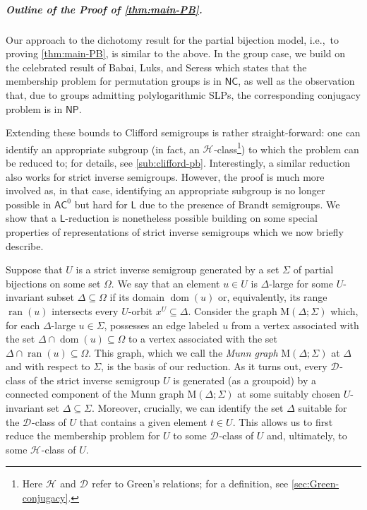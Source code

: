 \documentclass[anonymous,letter,UKenglish,cleveref,autoref,thm-restate]{lipics-v2021}
\newcommand{\ie}{i.e.,~}
\newcommand{\sse}{\subseteq}
\newcommand{\dom}{\operatorname{dom}}
\newcommand{\ran}{\operatorname{ran}}
\newcommand{\ACz}{\ensuremath{\mathsf{AC}^0}\xspace}
\newcommand{\NC}{\ensuremath{\mathsf{NC}}\xspace}
\newcommand{\LOGSPACE}{\ensuremath{\mathsf{L}}\xspace}
\newcommand{\NP}{\ensuremath{\mathsf{NP}}\xspace}
\newcommand*{\gH}[1][]{\mathrel{\mathcal{H}_{#1}}}
\newcommand*{\gD}[1][]{\mathrel{\mathcal{D}_{#1}}}
\theoremstyle{plain}
\theoremstyle{plain}
\newcommand{\mysubparagraph}[1]{\vspace*{-2mm}\subparagraph*{#1}}
\begin{document}
\mysubparagraph{Outline of the Proof of \cref{thm:main-PB}.}

Our approach to the dichotomy result for the partial bijection model, \ie to proving \cref{thm:main-PB}, is similar to the above.
In the group case, we build on the celebrated result of Babai, Luks, and Seress \cite{BabaiLS87} which states that the membership problem for permutation groups is in \NC, as well as the observation that, due to groups admitting polylogarithmic SLPs, the corresponding conjugacy problem is in \NP.

Extending these bounds to Clifford semigroups is rather straight-forward: 
one can identify an appropriate subgroup (in fact, an $\gH$-class\footnote{Here $\gH$ and $\gD$ refer to Green's relations; for a definition, see \cref{sec:Green-conjugacy}.}) to which the problem can be reduced to; for details, see \cref{sub:clifford-pb}.
Interestingly, a similar reduction also works for strict inverse semigroups.
However, the proof is much more involved as, in that case, identifying an appropriate subgroup is no longer possible in \ACz but hard for \LOGSPACE due to the presence of Brandt semigroups.
We show that a \LOGSPACE-reduction is nonetheless possible building on some special properties of representations of strict inverse semigroups which we now briefly describe.

Suppose that $U$ is a strict inverse semigroup generated by a set $\Sigma$ of partial bijections on some set $\Omega$.
We say that an element $u \in U$ is $\Delta$-large for some $U$-invariant subset $\Delta \sse \Omega$ if its domain $\dom(u)$ or, equivalently, its range $\ran(u)$ intersects every $U$-orbit $x^U \sse \Delta$.
Consider the graph $\mathrm{M}(\Delta; \Sigma)$ which, for each $\Delta$-large $u \in \Sigma$, possesses an edge labeled $u$ from a vertex associated with the set $\Delta \cap \dom(u) \sse \Omega$ to a vertex associated with the set $\Delta \cap \ran(u) \sse \Omega$.
This graph, which we call the \emph{Munn graph} $\mathrm{M}(\Delta; \Sigma)$ at $\Delta$ and with respect to $\Sigma$, is the basis of our reduction.
As it turns out, every $\gD$-class of the strict inverse semigroup $U$ is generated (as a groupoid) by a connected component of the Munn graph $\mathrm{M}(\Delta; \Sigma)$ at some suitably chosen $U$-invariant set $\Delta \sse \Sigma$.
Moreover, crucially, we can identify the set $\Delta$ suitable for the $\gD$-class of $U$ that contains a given element $t \in U$.
This allows us to first reduce the membership problem for $U$ to some $\gD$-class of $U$ and, ultimately, to some $\gH$-class of $U$.
\end{document}
